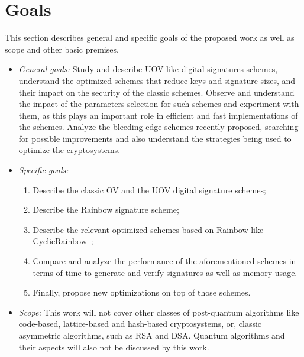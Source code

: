 \documentclass{ufsctex/ufsctex}
\begin{document}
\section{Goals}

This section describes general and specific goals of the proposed work as well
as scope and other basic premises.

\begin{itemize}

	\item \textit{General goals:} Study and describe UOV-like digital
	signatures schemes, understand the optimized schemes that reduce keys and
	signature sizes, and their impact on the security of the classic schemes.
	Observe and understand the impact of the parameters selection for such
	schemes and experiment with them, as this plays an important role in
	efficient and fast implementations of the schemes. Analyze the bleeding
	edge schemes recently proposed, searching for possible improvements and
	also understand the strategies being used to optimize the cryptosystems.

	\item \textit{Specific goals:} \begin{enumerate}

		\item Describe the classic OV and the UOV digital signature schemes;

		\item Describe the Rainbow signature scheme;

		\item Describe the relevant optimized schemes based on Rainbow like
		CyclicRainbow~\cite{petzoldt2010cyclicrainbow};

		\item Compare and analyze the performance of the aforementioned schemes
		in terms of time to generate and verify signatures as well as memory
		usage.

		\item Finally, propose new optimizations on top of those schemes.

	\end{enumerate}

	\item \textit{Scope:} This work will not cover other classes of
	post-quantum algorithms like code-based, lattice-based and hash-based
	cryptosystems, or, classic asymmetric algorithms, such as RSA and DSA.
	Quantum algorithms and their aspects will also not be discussed by this
	work.


\end{itemize}
\end{document}
